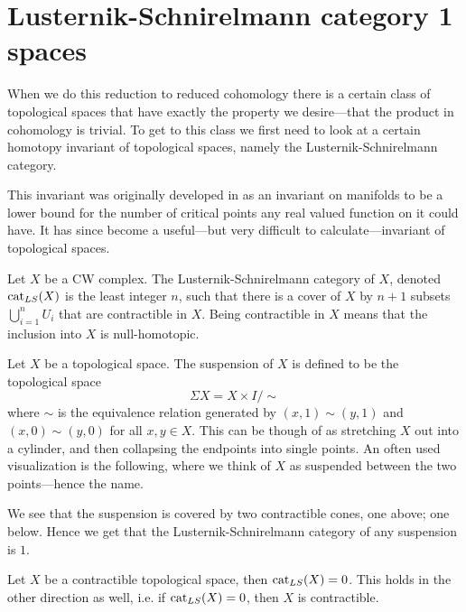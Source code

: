 \section{Lusternik-Schnirelmann category 1 spaces}

When we do this reduction to reduced cohomology there is a certain class of topological spaces that have exactly the property we desire---that the product in cohomology is trivial. To get to this class we first need to look at a certain homotopy invariant of topological spaces, namely the Lusternik-Schnirelmann category. 

This invariant was originally developed in \cite{lscat} as an invariant on manifolds to be a lower bound for the number of critical points any real valued function on it could have. It has since become a useful---but very difficult to calculate---invariant of topological spaces. 

\begin{definition}
Let $X$ be a CW complex. The Lusternik-Schnirelmann category of $X$, denoted $\text{cat}_{LS}(X)$ is the least integer $n$, such that there is a cover of $X$ by $n+1$ subsets $\bigcup_{i=1}^n U_i$ that are contractible in $X$. Being contractible in $X$ means that the inclusion into $X$ is null-homotopic. 
\end{definition}

\begin{example}
Let $X$ be a topological space. The suspension of $X$ is defined to be the topological space
\begin{equation*}
	\Sigma X = X\times I/\sim
\end{equation*}
where $\sim$ is the equivalence relation generated by $(x,1)\sim (y,1)$ and $(x,0)\sim (y,0)$ for all $x,y\in X$. This can be though of as stretching $X$ out into a cylinder, and then collapsing the endpoints into single points. An often used visualization is the following, where we think of $X$ as suspended between the two points---hence the name.
\begin{center}
\def\svgwidth{0.6\textwidth}

\end{center}
We see that the suspension is covered by two contractible cones, one above; one below. Hence we get that the Lusternik-Schnirelmann category of any suspension is $1$. 
\end{example}

\begin{example}
Let $X$ be a contractible topological space, then $\text{cat}_{LS}(X)=0$. This holds in the other direction as well, i.e. if $\text{cat}_{LS}(X)=0$, then $X$ is contractible.
\end{example}


